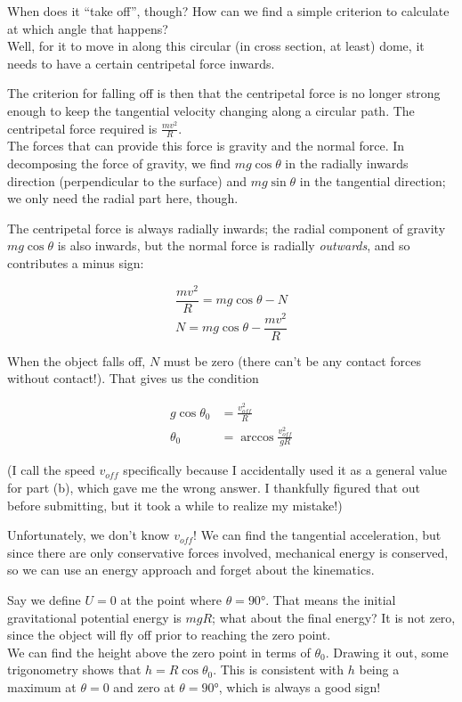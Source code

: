 \documentclass[8.01x]{subfiles}
\begin{document}
When does it ``take off'', though? How can we find a simple criterion to calculate at which angle that happens?\\
Well, for it to move in along this circular (in cross section, at least) dome, it needs to have a certain centripetal force inwards.

The criterion for falling off is then that the centripetal force is no longer strong enough to keep the tangential velocity changing along a circular path. The centripetal force required is $\displaystyle \frac{m v^2}{R}$.\\
The forces that can provide this force is gravity and the normal force. In decomposing the force of gravity, we find $m g \cos \theta$ in the radially inwards direction (perpendicular to the surface) and $m g \sin \theta$ in the tangential direction; we only need the radial part here, though.

The centripetal force is always radially inwards; the radial component of gravity $m g \cos \theta$ is also inwards, but the normal force is radially \emph{outwards}, and so contributes a minus sign:

\begin{equation}
\frac{m v^2}{R} = m g \cos \theta - N
\end{equation}
\begin{equation}
N = m g \cos \theta - \frac{m v^2}{R}
\end{equation}

When the object falls off, $N$ must be zero (there can't be any contact forces without contact!). That gives us the condition

\begin{align}
g \cos \theta_0 &= \frac{v_{off}^2}{R}\\
\theta_0 &= \arccos \frac{v_{off}^2}{g R} \label{midterm2:t0}
\end{align}

(I call the speed $v_{off}$ specifically because I accidentally used it as a general value for part (b), which gave me the wrong answer. I thankfully figured that out before submitting, but it took a while to realize my mistake!)

Unfortunately, we don't know $v_{off}$! We can find the tangential acceleration, but since there are only conservative forces involved, mechanical energy is conserved, so we can use an energy approach and forget about the kinematics.

Say we define $U = 0$ at the point where $\theta = \ang{90}$. That means the initial gravitational potential energy is $m g R$; what about the final energy? It is not zero, since the object will fly off prior to reaching the zero point.\\
We can find the height above the zero point in terms of $\theta_0$. Drawing it out, some trigonometry shows that $h = R \cos \theta_0$. This is consistent with $h$ being a maximum at $\theta = 0$ and zero at $\theta = \ang{90}$, which is always a good sign!
\end{document}
